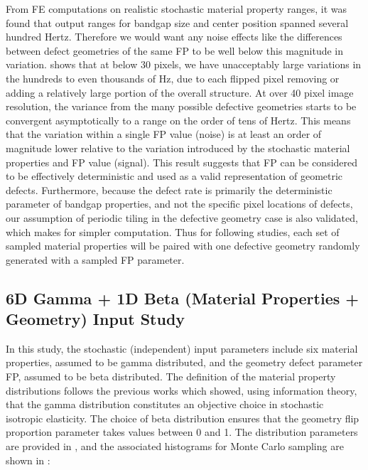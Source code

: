 \documentclass[preprint,review,12pt]{elsarticle}
\begin{document}
From FE computations on realistic stochastic material property ranges, it was found that output ranges for bandgap size and center position spanned several hundred Hertz. Therefore we would want any noise effects like the differences between defect geometries of the same FP to be well below this magnitude in variation.  shows that at below 30 pixels, we have unacceptably large variations in the hundreds to even thousands of Hz, due to each flipped pixel removing or adding a relatively large portion of the overall structure. At over 40 pixel image resolution, the variance from the many possible defective geometries starts to be convergent asymptotically to a range on the order of tens of Hertz. This means that the variation within a single FP value (noise) is at least an order of magnitude lower relative to the variation introduced by the stochastic material properties and FP value (signal). This result suggests that FP can be considered to be effectively deterministic and used as a valid representation of geometric defects. Furthermore, because the defect rate is primarily the deterministic parameter of bandgap properties, and not the specific pixel locations of defects, our assumption of periodic tiling in the defective geometry case is also validated, which makes for simpler computation. Thus for following studies, each set of sampled material properties will be paired with one defective geometry randomly generated with a sampled FP parameter.
\subsection{6D Gamma + 1D Beta (Material Properties + Geometry) Input Study}
\label{subsec:7D Gamma Input Space}

In this study, the stochastic (independent) input parameters include six material properties, assumed to be gamma distributed, and the geometry defect parameter FP, assumed to be beta distributed. The definition of the material property distributions follows the previous works \citep{Guilleminot_Soize_2013,Staber2017} which showed, using information theory, that the gamma distribution constitutes an objective choice in stochastic isotropic elasticity. The choice of beta distribution ensures that the geometry flip proportion parameter takes values between 0 and 1. The distribution parameters are provided in , and the associated histograms for Monte Carlo sampling are shown in : 
\end{document}
